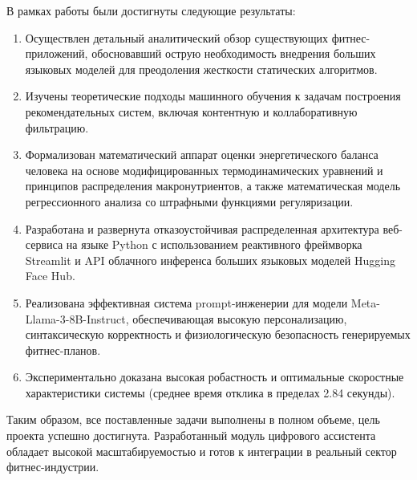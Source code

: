 \documentclass[14pt, a4paper]{extarticle}
\begin{document}
В рамках работы были достигнуты следующие результаты:
\begin{enumerate}
    \item Осуществлен детальный аналитический обзор существующих фитнес-приложений, обосновавший острую необходимость внедрения больших языковых моделей для преодоления жесткости статических алгоритмов.
    \item Изучены теоретические подходы машинного обучения к задачам построения рекомендательных систем, включая контентную и коллаборативную фильтрацию.
    \item Формализован математический аппарат оценки энергетического баланса человека на основе модифицированных термодинамических уравнений и принципов распределения макронутриентов, а также математическая модель регрессионного анализа со штрафными функциями регуляризации.
    \item Разработана и развернута отказоустойчивая распределенная архитектура веб-сервиса на языке Python с использованием реактивного фреймворка Streamlit и API облачного инференса больших языковых моделей Hugging Face Hub.
    \item Реализована эффективная система prompt-инженерии для модели Meta-Llama-3-8B-Instruct, обеспечивающая высокую персонализацию, синтаксическую корректность и физиологическую безопасность генерируемых фитнес-планов.
    \item Экспериментально доказана высокая робастность и оптимальные скоростные характеристики системы (среднее время отклика в пределах 2.84 секунды).
\end{enumerate}

Таким образом, все поставленные задачи выполнены в полном объеме, цель проекта успешно достигнута. Разработанный модуль цифрового ассистента обладает высокой масштабируемостью и готов к интеграции в реальный сектор фитнес-индустрии.
\end{document}
